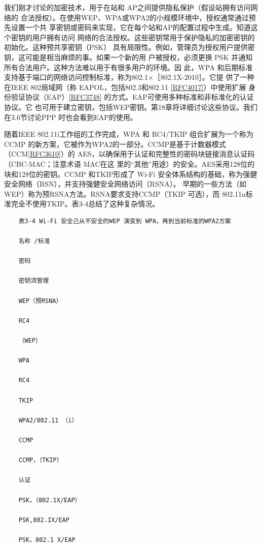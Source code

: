 我们刚才讨论的加密技术，用于在站和 AP之间提供隐私保护（假设站拥有访问网络的
合法授权）。在使用WEP、WPA或WPA2的小规模环境中，授权通常通过预先设置一个共
享密钥或密码来实现，它在每个站和AP的配置过程中生成。知道这个密钥的用户拥有访问
网络的合法授权。这些密钥常用于保护隐私的加密密钥的初始化。这种预共享密钥（PSK）
具有局限性。例如，管理员为授权用户提供密钥，这可能是相当麻烦的事。如果一个新的用
户被授权，必须更换 PSK 并通知所有合法用户。这种方法难以用于有很多用户的环境。因
此，WPA 和后期标准支持基于端口的网络访问控制标准，称为802.1×［802.1X-2010］。它提
供了一种在IEEE 802局域网（称 EAPOL，包括802.3和802.11
\href{https://www.rfc-editor.org/rfc/rfc4017}{[RFC4017]}）中使用扩展
身份验证协议（EAP）\href{https://www.rfc-editor.org/rfc/rfc3748}{[RFC3748]}
的方式。EAP可使用多种标准和非标准化的认证协议。它
也可用于建立密钥，包括WEP密钥。第18章将详细讨论这些协议。我们在3.6节讨论PPP
时也会看到EAP的使用。

随着IEEE 802.11i工作组的工作完成，WPA 和 RC4/TKIP 组合扩展为一个称为CCMP
的新方案，它被作为WPA2的一部分。CCMP是基于计数器模式（CCM\href{https://www.rfc-editor.org/rfc/rfc3610}{[RFC3610]}）的
AES，以确保用于认证和完整性的密码块链接消息认证码（CBC-MAC；注意术语 MAC在这
里的“其他”用途）的安全。AES采用128位的块和128位的密钥。CCMP 和TKIP形成了
Wi-Fi 安全体系结构的基础，称为强健安全网络（RSN），并支持强健安全网络访问（RSNA）。
早期的一些方法（如WEP）称为预RSNA方法。RSNA要求支持CCMP（TKIP 可选），而
802.11n标准完全不使用TKIP。表3-4总结了这种复杂情况。

\begin{verbatim}
    表3-4 Wi-Fi 安全己从不安全的WEP 演变到 WPA，再到当前标准的WPA2方案

    名称 /标准

    密码

    密钥流管理

    WEP（预RSNA）

    RC4

    （WEP）

    WPA

    RC4

    TKIP

    WPA2/802.11 （i）

    CCMP

    CCMP，（TKIP）

    认证

    PSK，（802.1X/EAP）

    PSK,802.IX/EAP

    PSK，802.1 X/EAP
\end{verbatim}

